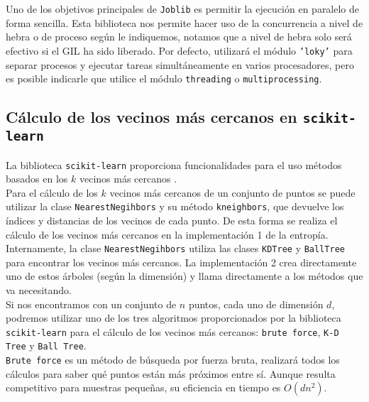 \documentclass[12pt,a4paper]{report} %
\theoremstyle{definition}
\begin{document}
Uno de los objetivos principales de \texttt{Joblib} \cite{joblib} es permitir la ejecución en paralelo de forma sencilla. Esta biblioteca nos permite hacer uso de la concurrencia a nivel de hebra o de proceso según le indiquemos, notamos que a nivel de hebra solo será efectivo si el GIL ha sido liberado. Por defecto, utilizará el módulo \texttt{'loky'} para separar procesos y ejecutar tareas simultáneamente en varios procesadores, pero es posible indicarle que utilice el módulo \texttt{threading} o \texttt{multiprocessing}.\\

\subsection{Cálculo de los vecinos más cercanos en \texttt{scikit-learn}}
La biblioteca \texttt{scikit-learn} proporciona funcionalidades para el uso métodos basados en los $k$ vecinos más cercanos \cite{doc_nn}.\\

Para el cálculo de los $k$ vecinos más cercanos de un conjunto de puntos se puede utilizar la clase \texttt{NearestNegihbors} \cite{nearestneighbors} y su método \texttt{kneighbors}, que devuelve los índices y distancias de los vecinos de cada punto. De esta forma se realiza el cálculo de los vecinos más cercanos en la implementación 1 de la entropía. Internamente, la clase \texttt{NearestNegihbors} utiliza las clases \texttt{KDTree} y \texttt{BallTree} para encontrar los vecinos más cercanos. La implementación 2 crea directamente uno de estos árboles (según la dimensión) y llama directamente a los métodos que va necesitando.\\

Si nos encontramos con un conjunto de $n$ puntos, cada uno de dimensión $d$, podremos utilizar uno de los tres algoritmos proporcionados por la biblioteca \texttt{scikit-learn} para el cálculo de los vecinos más cercanos: \texttt{brute force}, \texttt{K-D Tree} y \texttt{Ball Tree}.\\

\texttt{Brute force} es un método de búsqueda por fuerza bruta, realizará todos los cálculos para saber qué puntos están más próximos entre sí. Aunque resulta competitivo para muestras pequeñas, su eficiencia en tiempo es $O(dn^2)$.\\
\end{document}
